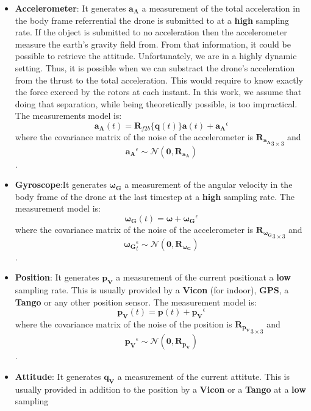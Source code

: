 \documentclass[]{article}
\begin{document}
\begin{itemize}
\item
  \textbf{Accelerometer}: It generates \(\mathbf{a_A}\) a measurement of
  the total acceleration in the body frame referrential the drone is
  submitted to at a \textbf{high} sampling rate. If the object is
  submitted to no acceleration then the accelerometer measure the
  earth's gravity field from. From that information, it could be
  possible to retrieve the attitude. Unfortunately, we are in a highly
  dynamic setting. Thus, it is possible when we can substract the
  drone's acceleration from the thrust to the total acceleration. This
  would require to know exactly the force exerced by the rotors at each
  instant. In this work, we assume that doing that separation, while
  being theoretically possible, is too impractical. The measurements
  model is:
  \[\mathbf{a_A}(t) = \mathbf{R}_{f2b}\{\mathbf{q}(t)\}\mathbf{a}(t) + \mathbf{a_A}^\epsilon\]
  where the covariance matrix of the noise of the accelerometer is
  \({\mathbf{R}_{\mathbf{a_A}}}_{3 \times 3}\) and
  \[\mathbf{a_A}^\epsilon \sim \mathcal{N}(\mathbf{0}, \mathbf{R}_{\mathbf{a_A}})\].
\item
  \textbf{Gyroscope}:It generates \(\mathbf{\boldsymbol{\omega}_G}\) a
  measurement of the angular velocity in the body frame of the drone at
  the last timestep at a \textbf{high} sampling rate. The measurement
  model is:
  \[\mathbf{\boldsymbol{\omega}_G}(t) = \boldsymbol{\omega} + \mathbf{\boldsymbol{\omega}_G}^\epsilon\]
  where the covariance matrix of the noise of the accelerometer is
  \({\mathbf{R}_{\mathbf{\boldsymbol{\omega}_G}}}_{3 \times 3}\) and
  \[\mathbf{\boldsymbol{\omega}_G}^\epsilon_t \sim \mathcal{N}(\mathbf{0}, \mathbf{R}_{\mathbf{\boldsymbol{\omega}_G}})\].
\item
  \textbf{Position}: It generates \(\mathbf{p_V}\) a measurement of the
  current positionat a \textbf{low} sampling rate. This is usually
  provided by a \textbf{Vicon} (for indoor), \textbf{GPS}, a
  \textbf{Tango} or any other position sensor. The measurement model is:
  \[\mathbf{p_V}(t) = \mathbf{p}(t) + \mathbf{p_V}^\epsilon\] where the
  covariance matrix of the noise of the position is
  \({\mathbf{R}_{\mathbf{p_V}}}_{3 \times 3}\) and
  \[\mathbf{p_V}^\epsilon \sim \mathcal{N}(\mathbf{0}, \mathbf{R}_{\mathbf{p_V}})\].
\item
  \textbf{Attitude}: It generates \(\mathbf{q_V}\) a measurement of the
  current attitute. This is usually provided in addition to the position
  by a \textbf{Vicon} or a \textbf{Tango} at a \textbf{low} sampling

\end{itemize}
\end{document}
